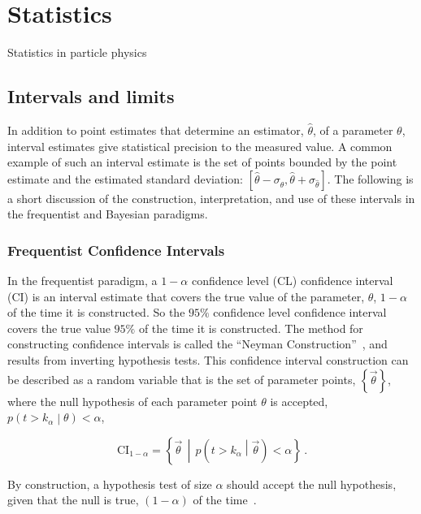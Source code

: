 \section{Statistics}\label{section:statistics}

Statistics in particle physics

\subsection{Intervals and limits}\label{section:intervals_and_limits}

In addition to point estimates that determine an estimator, $\hat{\theta}$, of a parameter $\theta$, interval estimates give statistical precision to the measured value.
A common example of such an interval estimate is the set of points bounded by the point estimate and the estimated standard deviation: $\left[\hat{\theta} - \sigma_{\hat{\theta}}, \hat{\theta} + \sigma_{\hat{\theta}}\right]$.
The following is a short discussion of the construction, interpretation, and use of these intervals in the frequentist and Bayesian paradigms.

\subsubsection{Frequentist Confidence Intervals}

In the frequentist paradigm, a $1-\alpha$ confidence level (CL) confidence interval (CI) is an interval estimate that covers the true value of the parameter, $\theta$, $1-\alpha$ of the time it is constructed.
So the $95\%$ confidence level confidence interval covers the true value $95\%$ of the time it is constructed.
The method for constructing confidence intervals is called the ``Neyman Construction''~\cite{Neyman:1937uhy}, and results from inverting hypothesis tests.
This confidence interval construction can be described as a random variable that is the set of parameter points, $\left\{\vec{\theta}\right\}$, where the null hypothesis of each parameter point $\theta$ is accepted, $p\left(t > k_{\alpha}\middle| \theta\right) < \alpha$,

\begin{equation}
 \mathrm{CI}_{1-\alpha} = \left\{\vec{\theta}\,\middle| \,p\left(t > k_{\alpha}\middle| \vec{\theta}\right) < \alpha\right\}\,.
 \label{eq:confidence_interval}
\end{equation}

By construction, a hypothesis test of size $\alpha$ should accept the null hypothesis, given that the null is true, $(1-\alpha)$ of the time~\cite{Cranmer:2015nia}.\\

